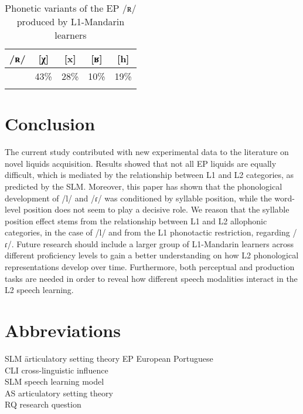 \documentclass[output=paper]{../langscibook}
\begin{document}
\begin{table}
\begin{tabular}{ccccc}
\lsptoprule
 /ʀ/ &  [χ] &  [x] &  [ʁ] &  [h]\\\midrule
     & 43\% & 28\% & 10\% & 19\%\\
\lspbottomrule
\end{tabular}
\caption{Phonetic variants of the EP /ʀ/ produced by L1-Mandarin learners}\label{tab:zhou:2}
\end{table}


\section{Conclusion}
\label{sec:zhou:6}

The current study contributed with new experimental data to the literature on novel liquids acquisition. Results showed that not all EP liquids are equally difficult, which is mediated by the relationship between L1 and L2 categories, as predicted by the SLM. Moreover, this paper has shown that the phonological development of /l/ and /ɾ/ was conditioned by syllable position, while the word-level position does not seem to play a decisive role. We reason that the syllable position effect stems from the relationship between L1 and L2 allophonic categories, in the case of /l/ and from the L1 phonotactic restriction, regarding /ɾ/. Future research should include a larger group of L1-Mandarin learners across different proficiency levels to gain a better understanding on how L2 phonological representations develop over time. Furthermore, both perceptual and production tasks are needed in order to reveal how different speech modalities interact in the L2 speech learning.

\section*{Abbreviations}

\begin{multicols}{2}
\begin{tabbing}
SLM \= articulatory setting theory\kill
EP  \> European Portuguese\\
CLI \> cross-linguistic influence\\
SLM \> speech learning model\\
AS  \> articulatory setting theory\\
RQ  \> research question
\end{tabbing}
\end{multicols}

\sloppy\printbibliography[heading=subbibliography,notkeyword=this]
\end{document}
